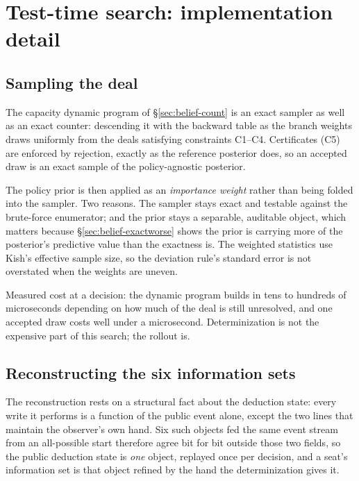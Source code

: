 \section{Test-time search: implementation detail}
\label{app:search}

\subsection{Sampling the deal}
\label{app:search-sampling}

The capacity dynamic program of \S\ref{sec:belief-count} is an exact sampler as well as an exact
counter: descending it with the backward table as the branch weights draws uniformly from the deals
satisfying constraints C1--C4. Certificates (C5) are enforced by rejection, exactly as the
reference posterior does, so an accepted draw is an exact sample of the policy-agnostic posterior.

The policy prior is then applied as an \emph{importance weight} rather than being folded into the
sampler. Two reasons. The sampler stays exact and testable against the brute-force enumerator; and
the prior stays a separable, auditable object, which matters because \S\ref{sec:belief-exactworse}
shows the prior is carrying more of the posterior's predictive value than the exactness is. The
weighted statistics use Kish's effective sample size, so the deviation rule's standard error is not
overstated when the weights are uneven.

Measured cost at a decision: the dynamic program builds in tens to hundreds of microseconds
depending on how much of the deal is still unresolved, and one accepted draw costs well under a
microsecond. Determinization is not the expensive part of this search; the rollout is.

\subsection{Reconstructing the six information sets}
\label{app:search-control}

The reconstruction rests on a structural fact about the deduction state: every write it performs is
a function of the public event alone, except the two lines that maintain the observer's own hand.
Six such objects fed the same event stream from an all-possible start therefore agree bit for bit
outside those two fields, so the public deduction state is \emph{one} object, replayed once per
decision, and a seat's information set is that object refined by the hand the determinization gives
it.

